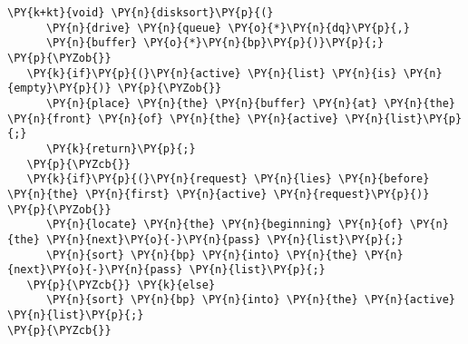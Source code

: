\begin{Verbatim}[commandchars=\\\{\}]
\PY{k+kt}{void} \PY{n}{disksort}\PY{p}{(}
      \PY{n}{drive} \PY{n}{queue} \PY{o}{*}\PY{n}{dq}\PY{p}{,}
      \PY{n}{buffer} \PY{o}{*}\PY{n}{bp}\PY{p}{)}\PY{p}{;}
\PY{p}{\PYZob{}}
   \PY{k}{if}\PY{p}{(}\PY{n}{active} \PY{n}{list} \PY{n}{is} \PY{n}{empty}\PY{p}{)} \PY{p}{\PYZob{}}
      \PY{n}{place} \PY{n}{the} \PY{n}{buffer} \PY{n}{at} \PY{n}{the} \PY{n}{front} \PY{n}{of} \PY{n}{the} \PY{n}{active} \PY{n}{list}\PY{p}{;}
      \PY{k}{return}\PY{p}{;}
   \PY{p}{\PYZcb{}}
   \PY{k}{if}\PY{p}{(}\PY{n}{request} \PY{n}{lies} \PY{n}{before} \PY{n}{the} \PY{n}{first} \PY{n}{active} \PY{n}{request}\PY{p}{)} \PY{p}{\PYZob{}}
      \PY{n}{locate} \PY{n}{the} \PY{n}{beginning} \PY{n}{of} \PY{n}{the} \PY{n}{next}\PY{o}{-}\PY{n}{pass} \PY{n}{list}\PY{p}{;}
      \PY{n}{sort} \PY{n}{bp} \PY{n}{into} \PY{n}{the} \PY{n}{next}\PY{o}{-}\PY{n}{pass} \PY{n}{list}\PY{p}{;}
   \PY{p}{\PYZcb{}} \PY{k}{else}
      \PY{n}{sort} \PY{n}{bp} \PY{n}{into} \PY{n}{the} \PY{n}{active} \PY{n}{list}\PY{p}{;}
\PY{p}{\PYZcb{}}
\end{Verbatim}
